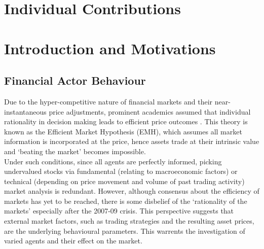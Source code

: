 \documentclass[11pt]{article}
\begin{document}
\newline

\section{Individual Contributions}

\section{Introduction and Motivations}
\subsection{Financial Actor Behaviour}

Due to the hyper-competitive nature of financial markets and their near-instantaneous price adjustments, prominent academics assumed that individual rationality in decision making leads to efficient price outcomes \citep{zeckhauser1991nonrational}. This theory is known as the Efficient Market Hypothesis (EMH), which assumes all market information is incorporated at the price, hence assets trade at their intrinsic value and `beating the market' becomes impossible. \\
Under such conditions, since all agents are perfectly informed, picking undervalued stocks via fundamental (relating to macroeconomic factors) or technical (depending on price movement and volume of past trading activity) market analysis is redundant. However, although consensus about the efficiency of markets has yet to be reached, there is some disbelief of the ‘rationality of the markets’ especially after the 2007-09 crisis. This perspective suggests that external market factors, such as trading strategies and the resulting asset prices, are the underlying behavioural parameters. This warrents the investigation of varied agents and their effect on the market. \\
\end{document}
